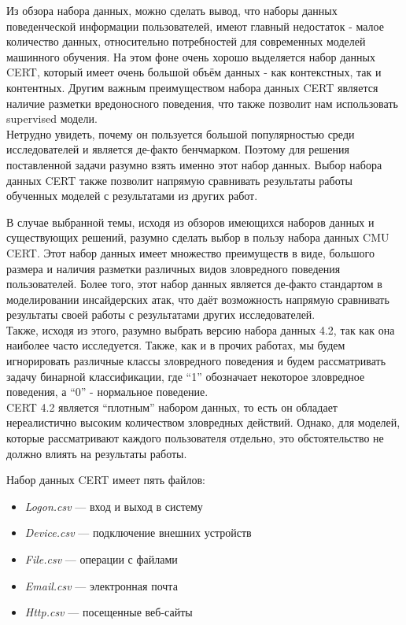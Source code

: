 Из обзора набора данных, можно сделать вывод, что наборы данных поведенческой информации пользователей, имеют главный недостаток - малое количество данных, относительно потребностей для современных моделей машинного обучения. На этом фоне очень хорошо выделяется набор данных CERT, который имеет очень большой объём данных - как контекстных, так и контентных. Другим важным преимуществом набора данных CERT является наличие разметки вредоносного поведения, что также позволит нам использовать supervised модели.\\
Нетрудно увидеть, почему он пользуется большой популярностью среди исследователей и является де-факто бенчмарком. Поэтому для решения поставленной задачи разумно взять именно этот набор данных. Выбор набора данных CERT также позволит напрямую сравнивать результаты работы обученных моделей с результатами из других работ.

В случае выбранной темы, исходя из обзоров имеющихся наборов данных и существующих решений, разумно сделать выбор в пользу набора данных CMU CERT. Этот набор данных имеет множество преимуществ в виде, большого размера и наличия разметки различных видов зловредного поведения пользователей. Более того, этот набор данных является де-факто стандартом в моделировании инсайдерских атак, что даёт возможность напрямую сравнивать результаты своей работы с результатами других исследователей.\\
Также, исходя из этого, разумно выбрать версию набора данных 4.2, так как она наиболее часто исследуется. Также, как и в прочих работах, мы будем игнорировать различные классы зловредного поведения и будем рассматривать задачу бинарной классификации, где ``1'' обозначает некоторое зловредное поведения, а ``0'' - нормальное поведение.\\
CERT 4.2 является ``плотным'' набором данных, то есть он обладает нереалистично высоким количеством зловредных действий. Однако, для моделей, которые рассматривают каждого пользователя отдельно, это обстоятельство не должно влиять на результаты работы.

Набор данных CERT имеет пять файлов:
\begin{itemize}
	\item \textit{Logon.csv} --- вход и выход в систему
	\item \textit{Device.csv} --- подключение внешних устройств
	\item \textit{File.csv} --- операции с файлами
	\item \textit{Email.csv} --- электронная почта
	\item \textit{Http.csv} --- посещенные веб-сайты
\end{itemize}

